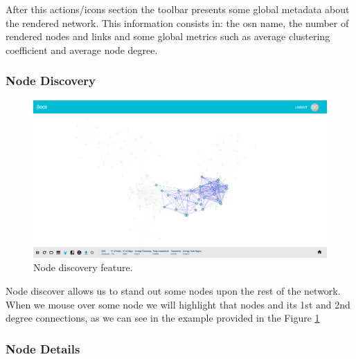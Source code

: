\indent After this actions/icons section the toolbar presents some global metadata about the rendered network. This information consists in: the \gls{osn} name, the number of rendered nodes and links and some global metrics such as average clustering coefficient and average node degree.

\subsubsection{Node Discovery}

\begin{figure}[h!]
\begin{center}
  \hspace*{-0.8in}
  \includegraphics[width=1.2\textwidth]{img/socii/socii_5.png}
\end{center}
\caption{\label{img:socii_5} Node discovery feature.}
\end{figure}

Node discover allows us to stand out some nodes upon the rest of the network. When we mouse over some node we will highlight that nodes and its 1st and 2nd degree connections, as we can see in the example provided in the Figure \ref{img:socii_5}

\subsubsection{Node Details}

